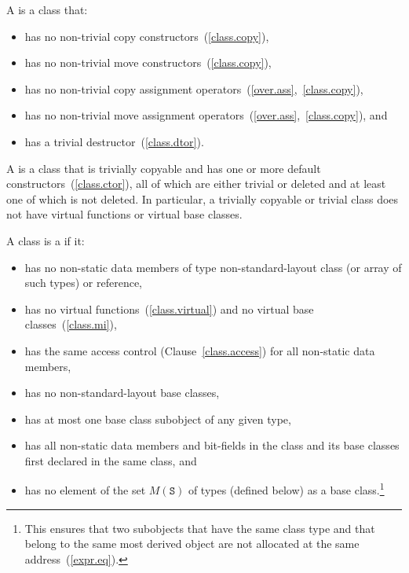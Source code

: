 %
%
%
\pnum
A  is a class that:

\begin{itemize}
\item has no non-trivial copy constructors~(\ref{class.copy}),
\item has no non-trivial move constructors~(\ref{class.copy}),
\item has no non-trivial copy assignment operators~(\ref{over.ass},~\ref{class.copy}),
\item has no non-trivial move assignment operators~(\ref{over.ass},~\ref{class.copy}), and
\item has a trivial destructor~(\ref{class.dtor}).
\end{itemize}

A  is a class that is trivially copyable and
has one or more default constructors~(\ref{class.ctor}),
all of which are either trivial or deleted and
at least one of which is not deleted.
\enternote In particular, a trivially copyable or trivial class does not have
virtual functions or virtual base classes.\exitnote

%
%
\pnum
A class  is a  if it:
\begin{itemize}
\item has no non-static data members of type non-standard-layout class
(or array of such types) or reference,

\item has no virtual functions~(\ref{class.virtual}) and no
virtual base classes~(\ref{class.mi}),

\item has the same access control (Clause~\ref{class.access})
for all non-static data members,

\item has no non-standard-layout base classes,

\item has at most one base class subobject of any given type,

\item has all non-static data members and bit-fields in the class and
its base classes first declared in the same class, and

\item has no element of the set $M(\mathtt{S})$ of types (defined below)
as a base class.\footnote{This ensures that two subobjects that have the
same class type and that
belong to the same most derived object are not allocated at the same
address~(\ref{expr.eq}).}
\end{itemize}

